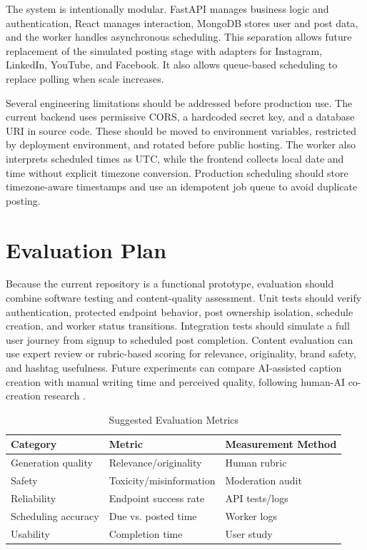 \documentclass[conference]{IEEEtran}
\begin{document}
The system is intentionally modular. FastAPI manages business logic and authentication, React manages interaction, MongoDB stores user and post data, and the worker handles asynchronous scheduling. This separation allows future replacement of the simulated posting stage with adapters for Instagram, LinkedIn, YouTube, and Facebook. It also allows queue-based scheduling to replace polling when scale increases.

Several engineering limitations should be addressed before production use. The current backend uses permissive CORS, a hardcoded secret key, and a database URI in source code. These should be moved to environment variables, restricted by deployment environment, and rotated before public hosting. The worker also interprets scheduled times as UTC, while the frontend collects local date and time without explicit timezone conversion. Production scheduling should store timezone-aware timestamps and use an idempotent job queue to avoid duplicate posting.

\section{Evaluation Plan}

Because the current repository is a functional prototype, evaluation should combine software testing and content-quality assessment. Unit tests should verify authentication, protected endpoint behavior, post ownership isolation, schedule creation, and worker status transitions. Integration tests should simulate a full user journey from signup to scheduled post completion. Content evaluation can use expert review or rubric-based scoring for relevance, originality, brand safety, and hashtag usefulness. Future experiments can compare AI-assisted caption creation with manual writing time and perceived quality, following human-AI co-creation research \cite{mcguire2024}.

\begin{table}[!t]
\caption{Suggested Evaluation Metrics}
\label{tab:metrics}
\centering
\scriptsize
\begin{tabular}{lll}
\toprule
Category & Metric & Measurement Method\\
\midrule
Generation quality & Relevance/originality & Human rubric\\
Safety & Toxicity/misinformation & Moderation audit\\
Reliability & Endpoint success rate & API tests/logs\\
Scheduling accuracy & Due vs. posted time & Worker logs\\
Usability & Completion time & User study\\
\bottomrule
\end{tabular}
\end{table}
\end{document}
